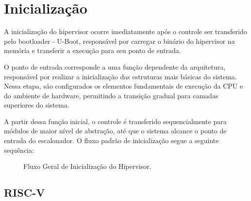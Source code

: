 \section{Inicialização}

A inicialização do hipervisor ocorre imediatamente após o controle ser transferido pelo bootloader - U-Boot,
responsável por carregar o binário do hipervisor na memória e transferir a execução para seu ponto de entrada.

O ponto de entrada corresponde a uma função dependente da arquitetura, responsável por realizar a inicialização das
estruturas mais básicas do sistema. Nessa etapa, são configurados os elementos fundamentais de execução da CPU e
do ambiente de hardware, permitindo a transição gradual para camadas superiores do sistema.

A partir dessa função inicial, o controle é transferido sequencialmente para módulos de maior nível de abstração,
até que o sistema alcance o ponto de entrada do escalonador. O fluxo padrão de inicialização segue a seguinte sequência:

\vspace{1cm}

\begin{figure}[htbp]
    \begin{center}
		\caption{Fluxo Geral de Inicialização do Hipervisor.}
	\end{center}
\end{figure}

\subsection{RISC-V}

